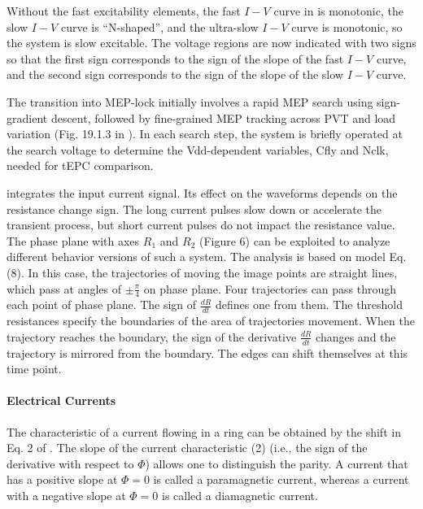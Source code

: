 \documentclass[11pt]{book}
\begin{document}
Without the fast excitability elements, the fast $I-V$ curve in \cite{ribar2019neuromodulation}
is monotonic, the slow $I-V$ curve is ``N-shaped'', and the ultra-slow
$I-V$ curve is monotonic, so the system is slow excitable. The voltage
regions are now indicated with two signs so that the first sign corresponds
to the sign of the slope of the fast $I-V$ curve, and the second
sign corresponds to the sign of the slope of the slow $I-V$ curve.

The transition into MEP-lock initially involves a rapid MEP search
using sign-gradient descent, followed by fine-grained MEP tracking
across PVT and load variation (Fig. 19.1.3 in \cite{ur201919}). In
each search step, the system is briefly operated at the search voltage
to determine the Vdd-dependent variables, Cfly and Nclk, needed for
tEPC comparison.

\cite{rakitin2021functional} integrates the input current signal.
Its effect on the waveforms depends on the resistance change sign.
The long current pulses slow down or accelerate the transient process,
but short current pulses do not impact the resistance value. The phase
plane with axes $R_{1}$ and $R_{2}$ (Figure 6) can be exploited
to analyze different behavior versions of such a system. The analysis
is based on model Eq. (8). In this case, the trajectories of moving
the image points are straight lines, which pass at angles of $\pm\frac{\pi}{4}$
on phase plane. Four trajectories can pass through each point of phase
plane. The sign of $\frac{dR}{dt}$ defines one from them. The threshold
resistances specify the boundaries of the area of trajectories movement.
When the trajectory reaches the boundary, the sign of the derivative
$\frac{dR}{dt}$ changes and the trajectory is mirrored from the boundary.
The edges can shift themselves at this time point.


\paragraph{Electrical Currents}

The characteristic of a current flowing in a ring can be obtained
by the shift in Eq. 2 of \cite{dajka2004persistent}. The slope of
the current characteristic (2) (i.e., the sign of the derivative with
respect to $\Phi$) allows one to distinguish the parity. A current
that has a positive slope at $\Phi=0$ is called a paramagnetic current,
whereas a current with a negative slope at $\Phi=0$ is called a diamagnetic
current.
\end{document}

